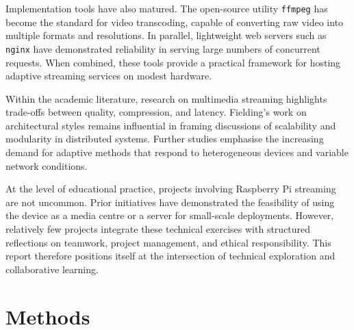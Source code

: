\documentclass[11pt]{article}
\begin{document}
Implementation tools have also matured. The open-source utility \texttt{ffmpeg} has become the standard for video transcoding, capable of converting raw video into multiple formats and resolutions. In parallel, lightweight web servers such as \texttt{nginx} have demonstrated reliability in serving large numbers of concurrent requests. When combined, these tools provide a practical framework for hosting adaptive streaming services on modest hardware.

Within the academic literature, research on multimedia streaming highlights trade-offs between quality, compression, and latency. Fielding’s \cite{fielding2000} work on architectural styles remains influential in framing discussions of scalability and modularity in distributed systems. Further studies emphasise the increasing demand for adaptive methods that respond to heterogeneous devices and variable network conditions.

At the level of educational practice, projects involving Raspberry Pi streaming are not uncommon. Prior initiatives have demonstrated the feasibility of using the device as a media centre or a server for small-scale deployments. However, relatively few projects integrate these technical exercises with structured reflections on teamwork, project management, and ethical responsibility. This report therefore positions itself at the intersection of technical exploration and collaborative learning.
\newpage
\section{Methods}
\end{document}
